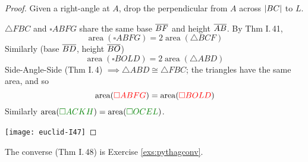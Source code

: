 \begin{proof}
	Given a right-angle at $A$, drop the perpendicular from $A$ across $\left| BC\right|$ to $L$.\par
	\begin{minipage}[t]{0.6\linewidth}\vspace{-5pt}
		$\triangle FBC$ and $\square ABFG$ share the same base $\overline{BF}$ and height $\overline{AB}$. By Thm I.\,41,
		\[
			\operatorname{area}(\square ABFG)=2\operatorname{area}(\triangle BCF)
		\]
		Similarly (base $\overline{BD}$, height $\overline{BO}$)
		\[
			\operatorname{area}(\square BOLD)=2\operatorname{area}(\triangle ABD)
		\]
		Side-Angle-Side (Thm I.\,4) $\implies\triangle ABD\cong\triangle FBC$; the triangles have the same area, and so
		\[
			\operatorname{area}(\textcolor{red}{\square ABFG})=\operatorname{area}(\textcolor{red}{\square BOLD})
		\]
		Similarly $\operatorname{area}(\textcolor{Green}{\square ACKH})=\operatorname{area}(\textcolor{Green}{\square OCEL})$.
	\end{minipage}
	\hfill
	\begin{minipage}[t]{0.39\linewidth}\vspace{-12pt}
		\texttt{[image: euclid-I47]}
	\end{minipage}
\end{proof}

The converse (Thm I.\,48) is Exercise \ref{exs:pythagconv}.


\goodbreak%


